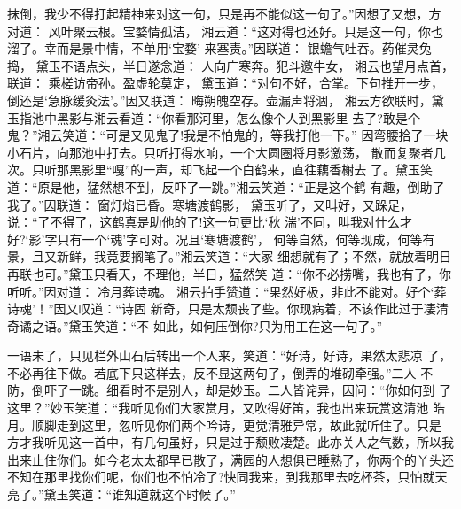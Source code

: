 抹倒，我少不得打起精神来对这一句，只是再不能似这一句了。”因想了又想，方
对道：
风叶聚云根。宝婺情孤洁，
湘云道：“这对得也还好。只是这一句，你也溜了。幸而是景中情，不单用‘宝婺’
来塞责。”因联道：
银蟾气吐吞。药催灵兔捣，
黛玉不语点头，半日遂念道：
人向广寒奔。犯斗邀牛女，
湘云也望月点首，联道：
乘槎访帝孙。盈虚轮莫定，
黛玉道：“对句不好，合掌。下句推开一步，倒还是‘急脉缓灸法’。”因又联道：
晦朔魄空存。壶漏声将涸，
湘云方欲联时，黛玉指池中黑影与湘云看道：“你看那河里，怎么像个人到黑影里
去了?敢是个鬼？”湘云笑道：“可是又见鬼了!我是不怕鬼的，等我打他一下。”
因弯腰拾了一块小石片，向那池中打去。只听打得水响，一个大圆圈将月影激荡，
散而复聚者几次。只听那黑影里“嘎”的一声，却飞起一个白鹤来，直往藕香榭去
了。黛玉笑道：“原是他，猛然想不到，反吓了一跳。”湘云笑道：“正是这个鹤
有趣，倒助了我了。”因联道：
窗灯焰已昏。寒塘渡鹤影，
黛玉听了，又叫好，又跺足，说：“了不得了，这鹤真是助他的了!这一句更比‘秋
湍’不同，叫我对什么才好?‘影’字只有一个‘魂’字可对。况且‘寒塘渡鹤’，
何等自然，何等现成，何等有景，且又新鲜，我竟要搁笔了。”湘云笑道：“大家
细想就有了；不然，就放着明日再联也可。”黛玉只看天，不理他，半日，猛然笑
道：“你不必捞嘴，我也有了，你听听。”因对道：
冷月葬诗魂。
湘云拍手赞道：“果然好极，非此不能对。好个‘葬诗魂’！”因又叹道：“诗固
新奇，只是太颓丧了些。你现病着，不该作此过于凄清奇谲之语。”黛玉笑道：“不
如此，如何压倒你?只为用工在这一句了。”

一语未了，只见栏外山石后转出一个人来，笑道：“好诗，好诗，果然太悲凉
了，不必再往下做。若底下只这样去，反不显这两句了，倒弄的堆砌牵强。”二人
不防，倒吓了一跳。细看时不是别人，却是妙玉。二人皆诧异，因问：“你如何到
了这里？”妙玉笑道：“我听见你们大家赏月，又吹得好笛，我也出来玩赏这清池
皓月。顺脚走到这里，忽听见你们两个吟诗，更觉清雅异常，故此就听住了。只是
方才我听见这一首中，有几句虽好，只是过于颓败凄楚。此亦关人之气数，所以我
出来止住你们。如今老太太都早已散了，满园的人想俱已睡熟了，你两个的丫头还
不知在那里找你们呢，你们也不怕冷了?快同我来，到我那里去吃杯茶，只怕就天
亮了。”黛玉笑道：“谁知道就这个时候了。”

